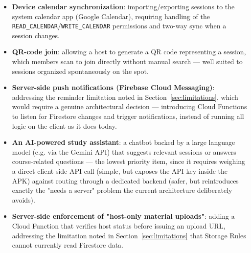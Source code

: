 \begin{itemize}
    \item \textbf{Device calendar synchronization}: importing/exporting sessions to the system calendar app (Google Calendar), requiring handling of the \texttt{READ\_CALENDAR}/\texttt{WRITE\_CALENDAR} permissions and two-way sync when a session changes.
    \item \textbf{QR-code join}: allowing a host to generate a QR code representing a session, which members scan to join directly without manual search — well suited to sessions organized spontaneously on the spot.
    \item \textbf{Server-side push notifications (Firebase Cloud Messaging)}: addressing the reminder limitation noted in Section~\ref{sec:limitations}, which would require a genuine architectural decision — introducing Cloud Functions to listen for Firestore changes and trigger notifications, instead of running all logic on the client as it does today.
    \item \textbf{An AI-powered study assistant}: a chatbot backed by a large language model (e.g. via the Gemini API) that suggests relevant sessions or answers course-related questions — the lowest priority item, since it requires weighing a direct client-side API call (simple, but exposes the API key inside the APK) against routing through a dedicated backend (safer, but reintroduces exactly the "needs a server" problem the current architecture deliberately avoids).
    \item \textbf{Server-side enforcement of "host-only material uploads"}: adding a Cloud Function that verifies host status before issuing an upload URL, addressing the limitation noted in Section~\ref{sec:limitations} that Storage Rules cannot currently read Firestore data.
\end{itemize}
